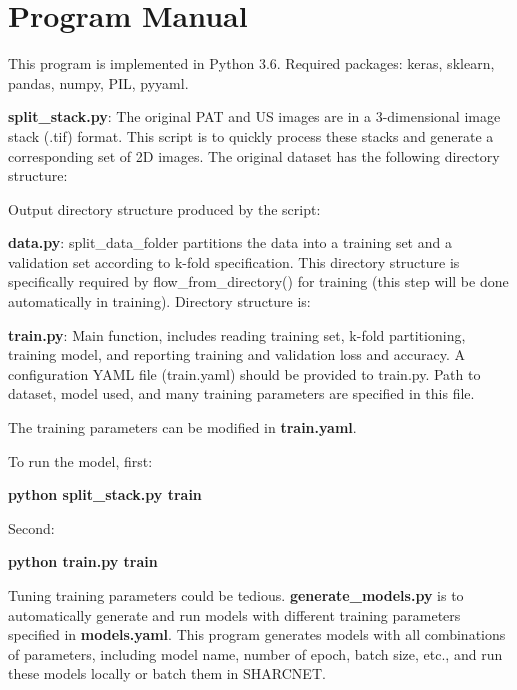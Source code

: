 \chapter{Program Manual} %
\label{appendixA}

This program is implemented in Python 3.6.
Required packages: keras, sklearn, pandas, numpy, PIL, pyyaml.

\textbf{split\_stack.py}: The original PAT and US images are in a 3-dimensional image stack (.tif) format. This script is to quickly process these stacks and generate a corresponding set of 2D images.
The original dataset has the following directory structure:

Output directory structure produced by the script:

\textbf{data.py}: split\_data\_folder partitions the data into a training set and a validation set according to k-fold specification. This directory structure is specifically required by flow\_from\_directory() for training (this step will be done automatically in training). Directory structure is:

\textbf{train.py}: Main function, includes reading training set, k-fold partitioning, training model, and reporting training and validation loss and accuracy. A configuration YAML file (train.yaml) should be provided to train.py. Path to dataset, model used, and many training parameters are specified in this file.

The training parameters can be modified in \textbf{train.yaml}.

To run the model, first:

\textbf{python split\_stack.py train}

Second:

\textbf{python train.py train}

Tuning training parameters could be tedious. \textbf{generate\_models.py} is to automatically generate and run models with different training parameters specified in \textbf{models.yaml}. This program generates models with all combinations of parameters, including model name, number of epoch, batch size, etc., and run these models locally or batch them in SHARCNET.